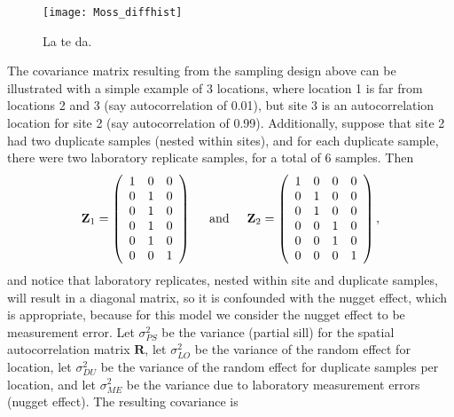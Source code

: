 \documentclass[12pt, titlepage]{article}
\begin{document}
\begin{figure}[H]
  \begin{center}
	    \texttt{[image: Moss\_diffhist]}
  \end{center}
  \caption{La te da.  \label{Fig:MossDiffHist}}
\end{figure}

\newpage{}

The covariance matrix resulting from the sampling design above can be illustrated with a simple example of 3 locations, where location 1 is far from locations 2 and 3 (say autocorrelation of 0.01), but site 3 is an autocorrelation location for site 2 (say autocorrelation of 0.99).  Additionally, suppose that site 2 had two duplicate samples (nested within sites), and for each duplicate sample, there were two laboratory replicate samples, for a total of 6 samples.  Then
$$
\mathbf{Z}_{1} = \left(
\begin{array}{ccc}
	1 & 0 & 0 \\
	0 & 1 & 0 \\
	0 & 1 & 0 \\
	0 & 1 & 0 \\
	0 & 1 & 0 \\
	0 & 0 & 1 \\
\end{array}
\right) 
\hspace{.5 cm} \textrm{and} \hspace{.5cm} 
\mathbf{Z}_{2} = \left(
\begin{array}{cccc}
	1 & 0 & 0 & 0 \\
	0 & 1 & 0 & 0 \\
	0 & 1 & 0 & 0 \\
	0 & 0 & 1 & 0 \\
	0 & 0 & 1 & 0 \\
	0 & 0 & 0 & 1 \\
\end{array}
\right), 
$$
and notice that laboratory replicates, nested within site and duplicate samples, will result in a diagonal matrix, so it is confounded with the nugget effect, which is appropriate, because for this model we consider the nugget effect to be measurement error.  Let $\sigma^{2}_{PS}$ be the variance (partial sill) for the spatial autocorrelation matrix $\mathbf{R}$, let $\sigma^{2}_{LO}$ be the variance of the random effect for location, let $\sigma^{2}_{DU}$ be the variance of the random effect for duplicate samples per location, and let $\sigma^{2}_{ME}$ be the variance due to laboratory measurement errors (nugget effect).  The resulting covariance is
\end{document}
